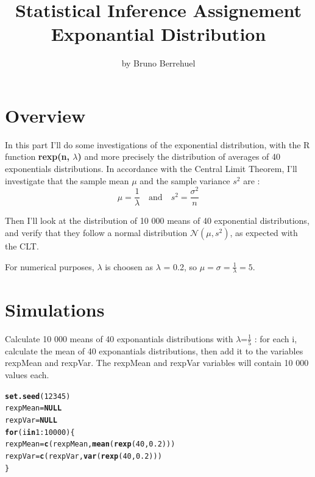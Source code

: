 \documentclass[a4paper, 11pt]{article}\usepackage[]{graphicx}\usepackage[]{color}
\title{Statistical Inference Assignement \\ Exponantial Distribution}
\author{by Bruno Berrehuel}
\makeatletter
\newcommand{\hlnum}[1]{\textcolor[rgb]{0.686,0.059,0.569}{#1}}%
\newcommand{\hlopt}[1]{\textcolor[rgb]{0,0,0}{#1}}%
\newcommand{\hlstd}[1]{\textcolor[rgb]{0.345,0.345,0.345}{#1}}%
\newcommand{\hlkwa}[1]{\textcolor[rgb]{0.161,0.373,0.58}{\textbf{#1}}}%
\newcommand{\hlkwb}[1]{\textcolor[rgb]{0.69,0.353,0.396}{#1}}%
\newcommand{\hlkwd}[1]{\textcolor[rgb]{0.737,0.353,0.396}{\textbf{#1}}}%
\newenvironment{kframe}{%
 \def\at@end@of@kframe{}%
 \ifinner\ifhmode%
  \def\at@end@of@kframe{\end{minipage}}%
  \begin{minipage}{\columnwidth}%
 \fi\fi%
 \def\FrameCommand##1{\hskip\@totalleftmargin \hskip-\fboxsep
 \colorbox{shadecolor}{##1}\hskip-\fboxsep
     \hskip-\linewidth \hskip-\@totalleftmargin \hskip\columnwidth}%
 \MakeFramed {\advance\hsize-\width
   \@totalleftmargin\z@ \linewidth\hsize
   \@setminipage}}%
 {\par\unskip\endMakeFramed%
 \at@end@of@kframe}
\newenvironment{knitrout}{}{} %
\makeatother
\begin{document}
\maketitle

\section{Overview}

In this part I'll do some investigations of the exponential distribution, with the R function \textbf{rexp(n, $\lambda$)} and more precisely the distribution of averages of 40 exponentials distributions.
In accordance with the Central Limit Theorem, I'll investigate that the sample mean $\mu$ and the sample variance $s^2$ are :
\begin{displaymath}
    \mu = \frac{1}{\lambda} \quad\mbox{and}\quad s^2 = \frac{\sigma^2}{n}
\end{displaymath}

Then I'll look at the distribution of 10 000 means of 40 exponential distributions, and verify that they follow a  normal distribution $\mathcal{N}(\mu,s^2)$, as expected with the CLT.

\noindent
For numerical purposes, $\lambda$ is choosen as $\lambda$ = 0.2, so $\mu = \sigma = \frac{1}{\lambda} = 5$.

\section{Simulations}

Calculate 10 000 means of 40 exponantials distributions with $\lambda$=$\frac{1}{5}$ : for each i, calculate the mean of 40 exponantials distributions, then add it to the variables rexpMean and rexpVar. The rexpMean and rexpVar variables will contain 10 000 values each.

\begin{knitrout}\small
{}\color{fgcolor}\begin{kframe}
\begin{alltt}
\hlkwd{set.seed}\hlstd{(}\hlnum{12345}\hlstd{)}
\hlstd{rexpMean}\hlkwb{=}\hlkwa{NULL}
\hlstd{rexpVar}\hlkwb{=}\hlkwa{NULL}
\hlkwa{for} \hlstd{(i} \hlkwa{in} \hlnum{1}\hlopt{:}\hlnum{10000}\hlstd{) \{}
    \hlstd{rexpMean} \hlkwb{=} \hlkwd{c}\hlstd{(rexpMean,} \hlkwd{mean}\hlstd{(}\hlkwd{rexp}\hlstd{(}\hlnum{40}\hlstd{,}\hlnum{0.2}\hlstd{)))}
    \hlstd{rexpVar} \hlkwb{=} \hlkwd{c}\hlstd{(rexpVar,} \hlkwd{var}\hlstd{(}\hlkwd{rexp}\hlstd{(}\hlnum{40}\hlstd{,}\hlnum{0.2}\hlstd{)))}
\hlstd{\}}
\end{alltt}
\end{kframe}
\end{knitrout}
\end{document}
